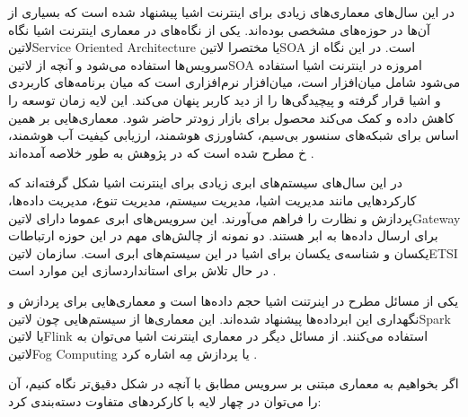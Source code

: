 در این سال‌های معماری‌های زیادی برای اینترنت اشیا پیشنهاد شده است که بسیاری از آن‌ها در حوزه‌های مشخصی بوده‌اند.
یکی از نگاه‌های در معماری اینترنت اشیا نگاه ‌لاتین{Service Oriented Architecture} یا مختصرا ‌لاتین{SOA} است.
در این نگاه از سرویس‌ها استفاده می‌شود و آنچه از ‌لاتین{SOA} امروزه در اینترنت اشیا استفاده می‌شود شامل میان‌افزار است، میان‌افزار نرم‌افزاری است که
میان برنامه‌های کاربردی و اشیا قرار گرفته و پیچیدگی‌ها را از دید کاربر پنهان می‌کند. این لایه زمان توسعه را کاهش داده و کمک می‌کند محصول برای بازار
زودتر حاضر شود. معماری‌هایی بر همین اساس برای شبکه‌های سنسور بی‌سیم، کشاورزی هوشمند، ارزیابی کیفیت آب هوشمند، ‌خ مطرح شده است که در پژوهش  به طور خلاصه آمده‌اند
.

در این سال‌های سیستم‌های ابری زیادی برای اینترنت اشیا شکل گرفته‌اند که کارکردهایی مانند مدیریت اشیا، مدیریت سیستم، مدیریت تنوع، مدیریت داده‌ها، پردازش و
نظارت را فراهم می‌آورند. این سرویس‌های ابری عموما دارای ‌لاتین{Gateway} برای ارسال داده‌ها به ابر هستند. دو نمونه از چالش‌های مهم در این حوزه ارتباطات یکسان و
شناسه‌ی یکسان برای اشیا در این سیستم‌های ابری است. سازمان ‌لاتین{ETSI} در حال تلاش برای استانداردسازی این موارد است
.

یکی از مسائل مطرح در اینرتنت اشیا حجم داده‌ها است و معماری‌هایی برای پردازش و نگهداری این ابرداده‌ها پیشنهاد شده‌اند. این معماری‌ها از سیستم‌هایی چون ‌لاتین{Spark} یا ‌لاتین{Flink} استفاده می‌کنند.
از مسائل دیگر در معماری اینترنت اشیا می‌توان به ‌لاتین{Fog Computing} یا پردازش مِه اشاره کرد
.

اگر بخواهیم به معماری مبتنی بر سرویس مطابق با آنچه در شکل  دقیق‌تر نگاه کنیم، آن را می‌توان در چهار لایه با کارکردهای متفاوت دسته‌بندی کرد:

